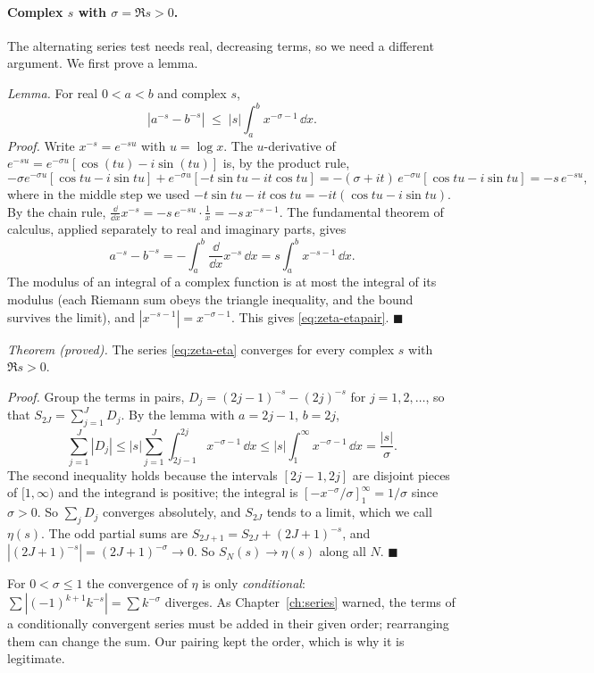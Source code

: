 \paragraph{Complex $s$ with $\sigma=\Re s>0$.} The alternating series test needs real, decreasing terms, so we need a different argument. We first prove a lemma.

\emph{Lemma.} For real $0<a<b$ and complex $s$,
\begin{equation}
|a^{-s}-b^{-s}|\;\le\;|s|\int_a^b x^{-\sigma-1}\,\dd x .
\label{eq:zeta-etapair}
\end{equation}
\emph{Proof.} Write $x^{-s}=e^{-su}$ with $u=\log x$. The $u$-derivative of $e^{-su}=e^{-\sigma u}[\cos(tu)-i\sin(tu)]$ is, by the product rule,
\[
-\sigma e^{-\sigma u}[\cos tu-i\sin tu]+e^{-\sigma u}[-t\sin tu-it\cos tu]
=-(\sigma+it)\,e^{-\sigma u}[\cos tu-i\sin tu]=-s\,e^{-su},
\]
where in the middle step we used $-t\sin tu-it\cos tu=-it(\cos tu-i\sin tu)$. By the chain rule, $\frac{\dd}{\dd x}x^{-s}=-s\,e^{-su}\cdot\frac1x=-s\,x^{-s-1}$. The fundamental theorem of calculus, applied separately to real and imaginary parts, gives
\[
a^{-s}-b^{-s}=-\int_a^b\frac{\dd}{\dd x}x^{-s}\,\dd x=s\int_a^b x^{-s-1}\,\dd x.
\]
The modulus of an integral of a complex function is at most the integral of its modulus (each Riemann sum obeys the triangle inequality, and the bound survives the limit), and $|x^{-s-1}|=x^{-\sigma-1}$. This gives \cref{eq:zeta-etapair}. $\blacksquare$

\emph{Theorem (proved).} The series \cref{eq:zeta-eta} converges for every complex $s$ with $\Re s>0$.

\emph{Proof.} Group the terms in pairs, $D_j=(2j-1)^{-s}-(2j)^{-s}$ for $j=1,2,\dots$, so that $S_{2J}=\sum_{j=1}^{J}D_j$. By the lemma with $a=2j-1$, $b=2j$,
\[
\sum_{j=1}^{J}|D_j|\le|s|\sum_{j=1}^{J}\int_{2j-1}^{2j}x^{-\sigma-1}\,\dd x\le|s|\int_1^{\infty}x^{-\sigma-1}\,\dd x=\frac{|s|}{\sigma}.
\]
The second inequality holds because the intervals $[2j-1,2j]$ are disjoint pieces of $[1,\infty)$ and the integrand is positive; the integral is $[-x^{-\sigma}/\sigma]_1^\infty=1/\sigma$ since $\sigma>0$. So $\sum_jD_j$ converges absolutely, and $S_{2J}$ tends to a limit, which we call $\eta(s)$. The odd partial sums are $S_{2J+1}=S_{2J}+(2J+1)^{-s}$, and $|(2J+1)^{-s}|=(2J+1)^{-\sigma}\to0$. So $S_N(s)\to\eta(s)$ along all $N$. $\blacksquare$

\begin{pitfall}
For $0<\sigma\le1$ the convergence of $\eta$ is only \emph{conditional}: $\sum|(-1)^{k+1}k^{-s}|=\sum k^{-\sigma}$ diverges. As Chapter~\ref{ch:series} warned, the terms of a conditionally convergent series must be added in their given order; rearranging them can change the sum. Our pairing kept the order, which is why it is legitimate.
\end{pitfall}


